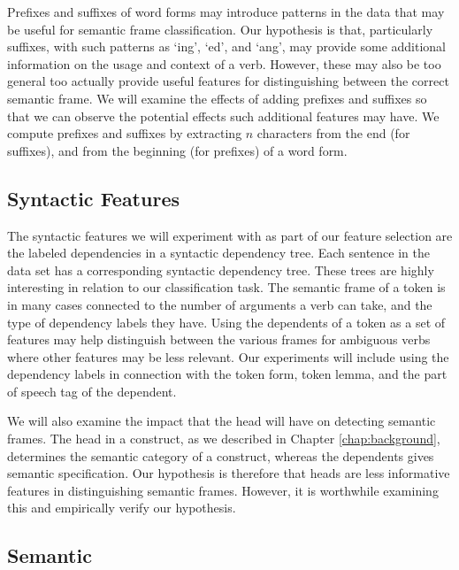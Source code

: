 Prefixes and suffixes of word forms may introduce patterns in the data that may be useful for semantic frame classification. Our hypothesis is that, particularly suffixes, with such patterns as `ing', `ed', and `ang', may provide some additional information on the usage and context of a verb. However, these may also be too general too actually provide useful features for distinguishing between the correct semantic frame. We will examine the effects of adding prefixes and suffixes so that we can observe the potential effects such additional features may have. We compute prefixes and suffixes by extracting $n$ characters from the end (for suffixes), and from the beginning (for prefixes) of a word form.

\subsection{Syntactic Features}

The syntactic features we will experiment with as part of our feature selection are the labeled dependencies in a syntactic dependency tree. Each sentence in the data set has a corresponding syntactic dependency tree. These trees are highly interesting in relation to our classification task. The semantic frame of a token is in many cases connected to the number of arguments a verb can take, and the type of dependency labels they have. Using the dependents of a token as a set of features may help distinguish between the various frames for ambiguous verbs where other features may be less relevant. Our experiments will include using the dependency labels in connection with the token form, token lemma, and the part of speech tag of the dependent.

We will also examine the impact that the head will have on detecting semantic frames. The head in a construct, as we described in Chapter \ref{chap:background}, determines the semantic category of a construct, whereas the dependents gives semantic specification. Our hypothesis is therefore that heads are less informative features in distinguishing semantic frames. However, it is worthwhile examining this and empirically verify our hypothesis.


\subsection{Semantic}

